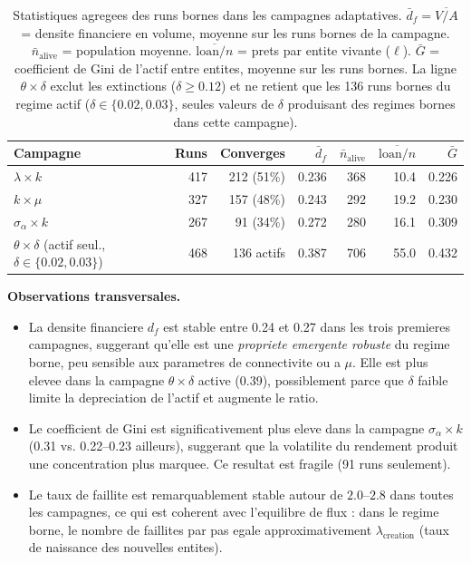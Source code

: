 \documentclass[11pt,a4paper]{article}
\begin{document}
\begin{table}[H]
\centering
\small
\begin{tabular}{lrrrrrr}
\toprule
Campagne & Runs & Converges & \(\bar{d}_f\) & \(\bar{n}_{\mathrm{alive}}\) & \(\overline{\mathrm{loan}/n}\) & \(\bar{G}\) \\
\midrule
\(\lambda \times k\) & 417 & 212 (51\%) & 0.236 & 368 & 10.4 & 0.226 \\
\(k \times \mu\)     & 327 & 157 (48\%) & 0.243 & 292 & 19.2 & 0.230 \\
\(\sigma_\alpha \times k\) & 267 & 91 (34\%) & 0.272 & 280 & 16.1 & 0.309 \\
\(\theta \times \delta\) (actif seul., \(\delta\in\{0.02,0.03\}\)) & 468 & 136 actifs & 0.387 & 706 & 55.0 & 0.432 \\
\bottomrule
\end{tabular}
\caption{Statistiques agregees des runs bornes dans les campagnes adaptatives.
$\bar{d}_f = \overline{V/A}$ = densite financiere en volume, moyenne sur les
runs bornes de la campagne.
$\bar{n}_{\mathrm{alive}}$ = population moyenne.
$\overline{\mathrm{loan}/n}$ = prets par entite vivante (\(\ell\)).
$\bar{G}$ = coefficient de Gini de l'actif entre entites, moyenne sur les runs
bornes.
La ligne \(\theta \times \delta\) exclut les extinctions (\(\delta \ge 0.12\))
et ne retient que les 136 runs bornes du regime actif (\(\delta \in \{0.02, 0.03\}\),
seules valeurs de \(\delta\) produisant des regimes bornes dans cette campagne).}
\end{table}

\textbf{Observations transversales.}
\begin{itemize}
  \item La densite financiere \(d_f\) est stable entre 0.24 et 0.27 dans les trois
    premieres campagnes, suggerant qu'elle est une \emph{propriete emergente robuste}
    du regime borne, peu sensible aux parametres de connectivite ou a \(\mu\).
    Elle est plus elevee dans la campagne \(\theta\times\delta\) active (0.39),
    possiblement parce que \(\delta\) faible limite la depreciation de l'actif et
    augmente le ratio.
  \item Le coefficient de Gini est significativement plus eleve dans la campagne
    \(\sigma_\alpha \times k\) (0.31 vs. 0.22--0.23 ailleurs), suggerant que
    la volatilite du rendement produit une concentration plus marquee.
    Ce resultat est fragile (91 runs seulement).
  \item Le taux de faillite est remarquablement stable autour de \(2.0\)--\(2.8\)
    dans toutes les campagnes, ce qui est coherent avec l'equilibre de flux :
    dans le regime borne, le nombre de faillites par pas egale approximativement
    \(\lambda_{\mathrm{creation}}\) (taux de naissance des nouvelles entites).
\end{itemize}
\end{document}
